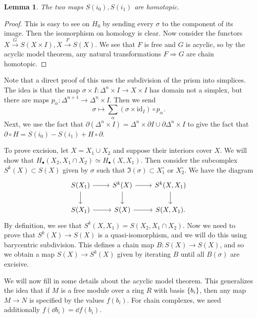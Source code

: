 \documentclass[leqno, openany]{memoir}
\newtheorem{lem}[thm]{Lemma}
\theoremstyle{definition}
\theoremstyle{remark}
\theoremstyle{plain}
\theoremstyle{definition}
\theoremstyle{remark}
\newcommand{\mr}[1]{\mathrm{#1}}
\begin{document}
\begin{lem}
    The two maps $S(i_0), S(i_1)$ are homotopic.
\end{lem}

\begin{proof}
    This is easy to see on $H_0$ by sending every $\sigma$ to the component of its image. Then the isomorphism on homology is clear. Now consider the functors $X \xrightarrow{G} S(X \times I), X \xrightarrow{F} S(X)$. We see that $F$ is free and $G$ is acyclic, so by the acyclic model theorem, any natural transformations $F \Rightarrow G$ are chain homotopic.
\end{proof}

Note that a direct proof of this uses the subdivision of the prism into simplices. The idea is that the map $\sigma \times I \colon \Delta^n \times I \to X \times I$ has domain not a simplex, but there are maps $p_{\alpha} \colon \Delta^{n+1} \to \Delta^n \times I$. Then we send
\[ \sigma \mapsto \sum_{\alpha} (\sigma \times \mr{id}_I) \circ p_{\alpha}. \]
Next, we use the fact that $\partial(\Delta^n \times I) = \Delta^n \times \partial I \cup \partial \Delta^n \times I$ to give the fact that $\partial \circ H = S(i_0) - S(i_1) + H \circ \partial$.

To prove excision, let $X = X_1 \cup X_2$ and suppose their interiors cover $X$. We will show that $H_{\bullet}(X_2, X_1 \cap X_2) \simeq H_{\bullet}(X, X_1)$. Then consider the subcomplex $S^k(X) \subset S(X)$ given by $\sigma$ such that $\Im(\sigma) \subset X_1^{\circ}$ or $X_2^{\circ}$. We have
the diagram
\begin{equation*}
\begin{tikzcd}
    S(X_1) \arrow{d} \arrow{r} & S^k(X) \arrow{d} \arrow{r} & S^k(X, X_1) \arrow{d} \\
    S(X_1) \arrow{r} & S(X) \arrow{r} & S(X, X_1).
\end{tikzcd}
\end{equation*}
By definition, we see that $S^k(X, X_1) = S(X_2, X_1 \cap X_2)$. Now we need to prove that $S^k(X) \to S(X)$ is a quasi-isomorphism, and we will do this using barycentric subdivision. This defines a chain map $B \colon S(X) \to S(X)$, and so we obtain a map $S(X) \to S^k(X)$ given by iterating $B$ until all $B(\sigma)$ are excisive.

We will now fill in some details about the acyclic model theorem. This generalizes the idea that if $M$ is a free module over a ring $R$ with basis $\qty{b_i}$, then any map $M \to N$ is specified by the values $f(b_i)$. For chain complexes, we need additionally $f(\dd b_i) = \dd{f(b_i)}$.
\end{document}
